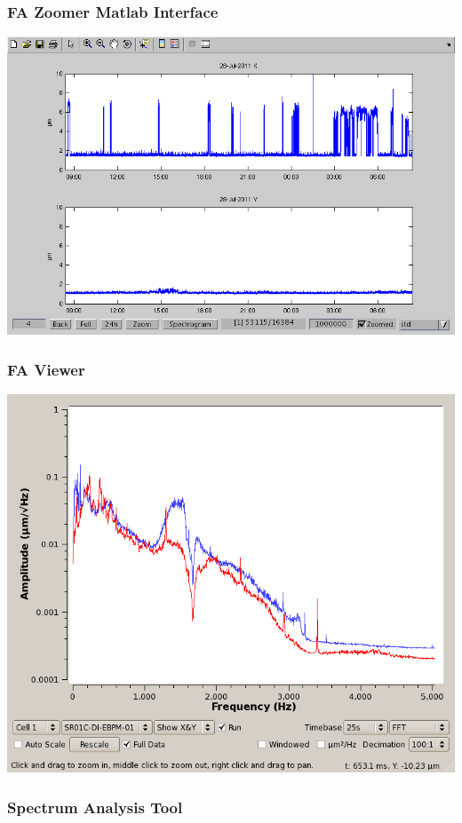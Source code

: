 \documentclass{beamer}
\begin{document}
\begin{frame}\frametitle{FA Zoomer Matlab Interface}
\includegraphics[width=\linewidth]{fa-zoomer}
\end{frame}



\begin{frame}\frametitle{FA Viewer}
\begin{center}
\includegraphics[width=.85\linewidth]{WEPMN004f6}
\end{center}
\end{frame}



\begin{frame}\frametitle{Spectrum Analysis Tool}
\begin{center}

\end{center}
\end{frame}
\end{document}
